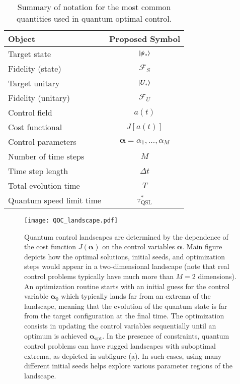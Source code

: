 \begin{table}[b]
\centering
\begin{tabular}{|p{12.5cm}|c|}
\hline
Object & Proposed Symbol \\
\hline\hline
Target state & $\ket{\psi_\ast}$ \\
\hline
Fidelity (state) & $\mathcal{F}_S$ \\
\hline
Target unitary & $\ket{U_\ast}$ \\
\hline
Fidelity (unitary) & $\mathcal{F}_U$ \\
\hline
Control field & $a(t)$ \\
\hline
Cost functional & $J[a(t)]$ \\
\hline
Control parameters & $\bm{\alpha}={\alpha_1,\ldots,\alpha_M}$  \\
\hline
Number of time steps & $M$\\
\hline 
Time step length & $\Delta t$ \\
\hline
Total evolution time & $T$ \\
\hline
Quantum speed limit time & $\tau_{\mathrm{QSL}}^\ast$ \\
\hline
\end{tabular}
\caption{Summary of notation for the most common quantities used in quantum optimal control.}
\label{table:QOCSymbols}
\end{table}

\begin{figure}[t]
\centering
\texttt{[image: QOC\_landscape.pdf]}
\caption{Quantum control landscapes are determined by the dependence of the cost function $J(\bm{\alpha})$ on the control variables $\bm{\alpha}$. Main figure depicts how the optimal solutions, initial seeds, and optimization steps would appear in a two-dimensional landscape (note that real control problems typically have much more than $M=2$ dimensions). An optimization routine starts with an initial guess for the control variable $\bm{\alpha}_0$ which typically lands far from an extrema of the landscape, meaning that the evolution of the quantum state is far from the target configuration at the final time. The optimization consists in updating the control variables sequentially until an optimum is achieved $\bm{\alpha}_{\text{opt}}$. In the presence of constraints, quantum control problems can have rugged landscapes with suboptimal extrema, as depicted in subfigure (a). In such cases, using many different initial seeds helps explore various parameter regions of the landscape.}
\label{fig:QOC_landscapes}
\end{figure}



